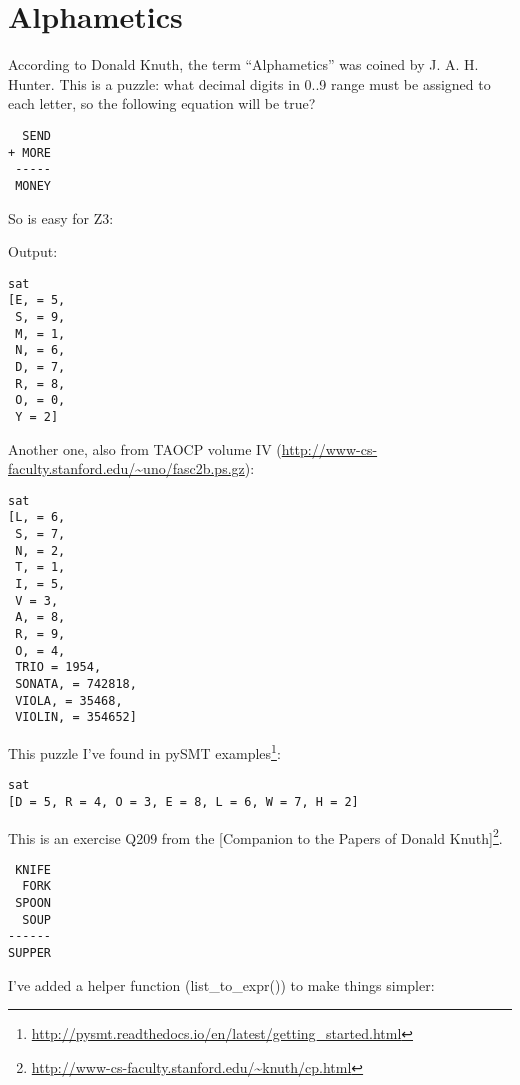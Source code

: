 \section{Alphametics}

According to Donald Knuth, the term ``Alphametics'' was coined by J. A. H. Hunter.
This is a puzzle: what decimal digits in 0..9 range must be assigned to each letter,
so the following equation will be true?

\begin{lstlisting}
  SEND
+ MORE
 -----
 MONEY
\end{lstlisting}

So is easy for Z3:



Output:

\begin{lstlisting}
sat
[E, = 5,
 S, = 9,
 M, = 1,
 N, = 6,
 D, = 7,
 R, = 8,
 O, = 0,
 Y = 2]
\end{lstlisting}

Another one, also from \ac{TAOCP} volume IV (\url{http://www-cs-faculty.stanford.edu/~uno/fasc2b.ps.gz}):



\begin{lstlisting}
sat
[L, = 6,
 S, = 7,
 N, = 2,
 T, = 1,
 I, = 5,
 V = 3,
 A, = 8,
 R, = 9,
 O, = 4,
 TRIO = 1954,
 SONATA, = 742818,
 VIOLA, = 35468,
 VIOLIN, = 354652]
\end{lstlisting}

This puzzle I've found in pySMT examples\footnote{\url{http://pysmt.readthedocs.io/en/latest/getting_started.html}}:



\begin{lstlisting}
sat
[D = 5, R = 4, O = 3, E = 8, L = 6, W = 7, H = 2]
\end{lstlisting}


This is an exercise Q209 from the 
[Companion to the Papers of Donald Knuth]\footnote{\url{http://www-cs-faculty.stanford.edu/~knuth/cp.html}}.

\begin{lstlisting}
 KNIFE
  FORK
 SPOON
  SOUP
------
SUPPER
\end{lstlisting}

I've added a helper function (list\_to\_expr()) to make things simpler:

